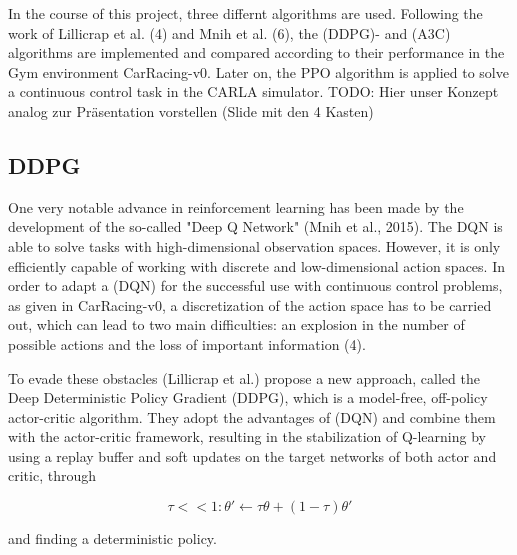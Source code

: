 \documentclass[letterpaper, 10 pt, conference]{ieeeconf}  %
\begin{document}
In the course of this project, three differnt algorithms are used. Following the work of Lillicrap et al. (4) and Mnih et al. (6), the (DDPG)- and (A3C) algorithms are implemented and compared according to their performance in the Gym environment CarRacing-v0. Later on, the PPO algorithm is applied to solve a continuous control task in the CARLA simulator.
TODO: Hier unser Konzept analog zur Präsentation vorstellen (Slide mit den 4 Kasten)

\subsection{DDPG}
One very notable advance in reinforcement learning has been made by the development of the so-called "Deep Q Network" (Mnih et al., 2015). The DQN is able to solve tasks with high-dimensional observation spaces. However, it is only efficiently capable of working with discrete and low-dimensional action spaces. In order to adapt a (DQN) for the successful use with continuous control problems, as given in CarRacing-v0, a discretization of the action space has to be carried out, which can lead to two main difficulties: an explosion in the number of possible actions and the loss of important information (4).

To evade these obstacles (Lillicrap et al.) propose a new approach, called the Deep Deterministic Policy Gradient (DDPG), which is a model-free, off-policy actor-critic algorithm. They adopt the advantages of (DQN) and combine them with the actor-critic framework, resulting in the stabilization of Q-learning by using a replay buffer and soft updates on the target networks of both actor and critic, through

\begin{equation}
\tau << 1:\theta' \leftarrow \tau\theta + (1-\tau)\theta'
\end{equation}

and finding a deterministic policy.
\end{document}
